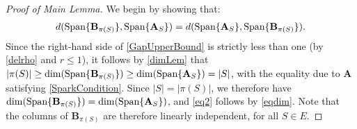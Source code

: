 \documentclass[9pt,twocolumn]{pnas-new}
\begin{document}
\begin{proof}[Proof of Main Lemma]
We begin by showing that: 
\begin{align}\label{eq2}
d(\text{\rm Span}\{\mathbf{B}_{\pi(S)}\}, \text{\rm Span}\{\mathbf{A}_S\} ) = d(\text{\rm Span}\{\mathbf{A}_S\}, \text{\rm Span}\{\mathbf{B}_{\pi(S)}\}).
\end{align}
Since the right-hand side of \eqref{GapUpperBound} is strictly less than one (by \eqref{delrho} and $r \leq 1$), it follows by \eqref{dimLem} that $|\pi(S)| \geq \dim(\text{\rm Span}\{\mathbf{B}_{\pi(S)}\}) \geq \dim(\text{\rm Span}\{\mathbf{A}_{S}\}) = |S|$, with the equality due to $\mathbf{A}$ satisfying \eqref{SparkCondition}. Since $|S| = |\pi(S)|$, we therefore have $\dim(\text{\rm Span}\{\mathbf{B}_{\pi(S)}\}) = \dim(\text{\rm Span}\{\mathbf{A}_{S}\})$, and \eqref{eq2} follows by \eqref{eqdim}. Note that the columns of $\mathbf{B}_{\pi(S)}$ are therefore linearly independent, for all $S \in E$.


\end{proof}
\end{document}
